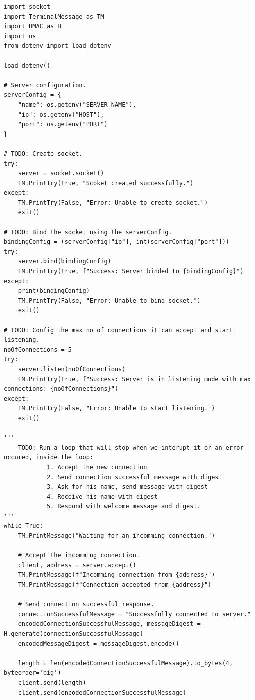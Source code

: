 \begin{lstlisting}[style=mypython, caption={server.py}, label={code:A-2-a-server}]
import socket
import TerminalMessage as TM
import HMAC as H
import os
from dotenv import load_dotenv

load_dotenv()

# Server configuration.
serverConfig = {
    "name": os.getenv("SERVER_NAME"),
    "ip": os.getenv("HOST"),
    "port": os.getenv("PORT")
}

# TODO: Create socket.
try:
    server = socket.socket()
    TM.PrintTry(True, "Scoket created successfully.")
except:
    TM.PrintTry(False, "Error: Unable to create socket.")
    exit()

# TODO: Bind the socket using the serverConfig.
bindingConfig = (serverConfig["ip"], int(serverConfig["port"]))
try:
    server.bind(bindingConfig)
    TM.PrintTry(True, f"Success: Server binded to {bindingConfig}")
except:
    print(bindingConfig)
    TM.PrintTry(False, "Error: Unable to bind socket.")
    exit()

# TODO: Config the max no of connections it can accept and start listening.
noOfConnections = 5
try:
    server.listen(noOfConnections)
    TM.PrintTry(True, f"Success: Server is in listening mode with max connections: {noOfConnections}")
except:
    TM.PrintTry(False, "Error: Unable to start listening.")
    exit()

'''
    TODO: Run a loop that will stop when we interupt it or an error occured, inside the loop:
            1. Accept the new connection
            2. Send connection successful message with digest
            3. Ask for his name, send message with digest
            4. Receive his name with digest
            5. Respond with welcome message and digest.
'''
while True:
    TM.PrintMessage("Waiting for an incomming connection.")

    # Accept the incomming connection.
    client, address = server.accept()
    TM.PrintMessage(f"Incomming connection from {address}")
    TM.PrintMessage(f"Connection accepted from {address}")

    # Send connection successful response.
    connectionSuccessfulMessage = "Successfully connected to server."
    encodedConnectionSuccessfulMessage, messageDigest = H.generate(connectionSuccessfulMessage)
    encodedMessageDigest = messageDigest.encode()

    length = len(encodedConnectionSuccessfulMessage).to_bytes(4, byteorder='big')
    client.send(length)
    client.send(encodedConnectionSuccessfulMessage)


\end{lstlisting}
